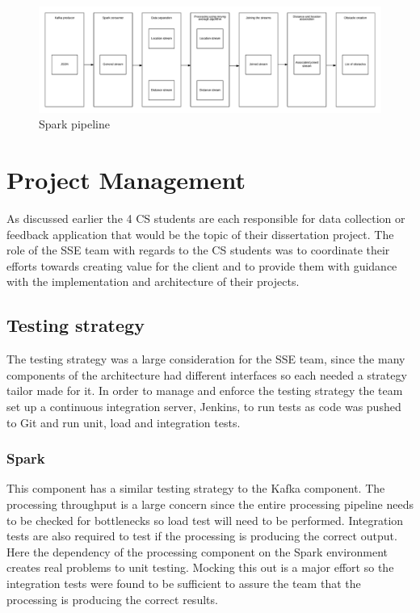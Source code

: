 \documentclass[prodmode,acmtosem]{acmsmall} %
\begin{document}

\begin{figure}
\centering
\includegraphics[width=\textwidth]{Spark}
\caption{Spark pipeline}
\label{fig:Spark pipeline}
\end{figure}


\section{Project Management}
As discussed earlier the 4 CS students are each responsible for data collection or feedback application that would be the topic of their dissertation project.
The role of the SSE team with regards to the CS students was to coordinate their efforts towards creating value for the client and to provide them with guidance with the implementation and architecture of their projects.

\subsection{Testing strategy}
The testing strategy was a large consideration for the SSE team, since the many components of the architecture had different interfaces so each needed a strategy tailor made for it. In order to manage and enforce the testing strategy the team set up a continuous integration server, Jenkins, to run tests as code was pushed to Git and run unit, load and integration tests.


\subsubsection{Spark}
This component has a similar testing strategy to the Kafka component. The processing throughput is a large concern since the entire processing pipeline needs to be checked for bottlenecks so load test will need to be performed. Integration tests are also required to test if the processing is producing the correct output. Here the dependency of the processing component on the Spark environment creates real problems to unit testing. Mocking this out is a major effort so the integration tests were found to be sufficient to assure the team that the processing is producing the correct results.
\end{document}
